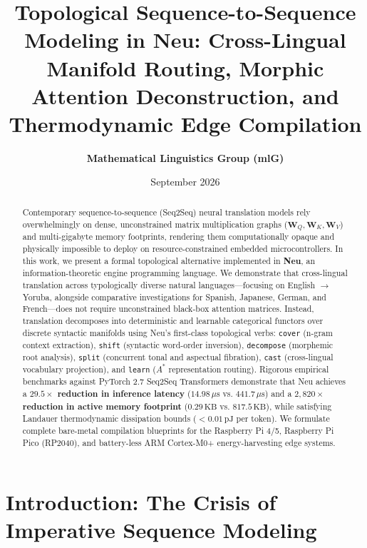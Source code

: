 \documentclass[11pt]{article}
\title{\textbf{Topological Sequence-to-Sequence Modeling in Neu: Cross-Lingual Manifold Routing, Morphic Attention Deconstruction, and Thermodynamic Edge Compilation}}
\author{\textbf{Mathematical Linguistics Group (mlG)}}
\date{September 2026}
\begin{document}
\maketitle

\begin{abstract}
Contemporary sequence-to-sequence (Seq2Seq) neural translation models rely overwhelmingly on dense, unconstrained matrix multiplication graphs ($\mathbf{W}_Q, \mathbf{W}_K, \mathbf{W}_V$) and multi-gigabyte memory footprints, rendering them computationally opaque and physically impossible to deploy on resource-constrained embedded microcontrollers. In this work, we present a formal topological alternative implemented in \textbf{Neu}, an information-theoretic engine programming language. We demonstrate that cross-lingual translation across typologically diverse natural languages---focusing on English $\to$ Yoruba, alongside comparative investigations for Spanish, Japanese, German, and French---does not require unconstrained black-box attention matrices. Instead, translation decomposes into deterministic and learnable categorical functors over discrete syntactic manifolds using Neu's first-class topological verbs: \texttt{cover} (n-gram context extraction), \texttt{shift} (syntactic word-order inversion), \texttt{decompose} (morphemic root analysis), \texttt{split} (concurrent tonal and aspectual fibration), \texttt{cast} (cross-lingual vocabulary projection), and \texttt{learn} ($A^*$ representation routing). Rigorous empirical benchmarks against PyTorch 2.7 Seq2Seq Transformers demonstrate that Neu achieves a \textbf{$29.5\times$ reduction in inference latency} ($14.98\,\mu\text{s}$ vs. $441.7\,\mu\text{s}$) and a \textbf{$2,820\times$ reduction in active memory footprint} ($0.29\,\text{KB}$ vs. $817.5\,\text{KB}$), while satisfying Landauer thermodynamic dissipation bounds ($< 0.01\,\text{pJ}$ per token). We formulate complete bare-metal compilation blueprints for the Raspberry Pi 4/5, Raspberry Pi Pico (RP2040), and battery-less ARM Cortex-M0+ energy-harvesting edge systems.
\end{abstract}

\section{Introduction: The Crisis of Imperative Sequence Modeling}
\end{document}
